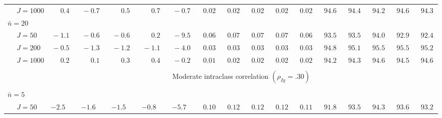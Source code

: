 \begin{sidewaystable}
\begin{threeparttable}
\begin{tabular}{llccccccccccccccc}
 & \nopagebreak $\;J=1000$  & $\phantom{0}\phantom{-}0.4\phantom{0}$ & $\phantom{0}{-}0.7\phantom{0}$ & $\phantom{0}\phantom{-}0.5\phantom{0}$ & $\phantom{0}\phantom{-}0.7\phantom{0}$ & $\phantom{0}{-}0.7\phantom{0}$ & $\phantom{0}0.02\phantom{0}$ & $\phantom{0}0.02\phantom{0}$ & $\phantom{0}0.02\phantom{0}$ & $\phantom{0}0.02\phantom{0}$ & $\phantom{0}0.02\phantom{0}$ & $\phantom{0}94.6\phantom{0}$ & $\phantom{0}94.4\phantom{0}$ & $\phantom{0}94.2\phantom{0}$ & $\phantom{0}94.6\phantom{0}$ & $\phantom{0}94.3\phantom{0}$ \\
\multicolumn{4}{l}{$\bar{n}=20$} \\  & \nopagebreak $\;J=50$  & $\phantom{0}{-}1.1\phantom{0}$ & $\phantom{0}{-}0.6\phantom{0}$ & $\phantom{0}{-}0.6\phantom{0}$ & $\phantom{0}\phantom{-}0.2\phantom{0}$ & $\phantom{0}{-}9.5\phantom{0}$ & $\phantom{0}0.06\phantom{0}$ & $\phantom{0}0.07\phantom{0}$ & $\phantom{0}0.07\phantom{0}$ & $\phantom{0}0.07\phantom{0}$ & $\phantom{0}0.06\phantom{0}$ & $\phantom{0}93.5\phantom{0}$ & $\phantom{0}93.5\phantom{0}$ & $\phantom{0}94.0\phantom{0}$ & $\phantom{0}92.9\phantom{0}$ & $\phantom{0}92.4\phantom{0}$ \\
 & \nopagebreak $\;J=200$  & $\phantom{0}{-}0.5\phantom{0}$ & $\phantom{0}{-}1.3\phantom{0}$ & $\phantom{0}{-}1.2\phantom{0}$ & $\phantom{0}{-}1.1\phantom{0}$ & $\phantom{0}{-}4.0\phantom{0}$ & $\phantom{0}0.03\phantom{0}$ & $\phantom{0}0.03\phantom{0}$ & $\phantom{0}0.03\phantom{0}$ & $\phantom{0}0.03\phantom{0}$ & $\phantom{0}0.03\phantom{0}$ & $\phantom{0}94.8\phantom{0}$ & $\phantom{0}95.1\phantom{0}$ & $\phantom{0}95.5\phantom{0}$ & $\phantom{0}95.5\phantom{0}$ & $\phantom{0}95.2\phantom{0}$ \\
 & \nopagebreak $\;J=1000$  & $\phantom{0}\phantom{-}0.2\phantom{0}$ & $\phantom{0}\phantom{-}0.1\phantom{0}$ & $\phantom{0}\phantom{-}0.3\phantom{0}$ & $\phantom{0}\phantom{-}0.4\phantom{0}$ & $\phantom{0}{-}0.2\phantom{0}$ & $\phantom{0}0.01\phantom{0}$ & $\phantom{0}0.02\phantom{0}$ & $\phantom{0}0.02\phantom{0}$ & $\phantom{0}0.02\phantom{0}$ & $\phantom{0}0.02\phantom{0}$ & $\phantom{0}94.2\phantom{0}$ & $\phantom{0}94.3\phantom{0}$ & $\phantom{0}94.6\phantom{0}$ & $\phantom{0}94.5\phantom{0}$ & $\phantom{0}94.6\phantom{0}$ \\
[0.5ex]\hline\\[-1.6ex] 
& & \multicolumn{15}{c}{Moderate intraclass correlation $(\rho_{Iy}=.30)$} \\[0.6ex]\hline\\[-1.8ex]
\multicolumn{4}{l}{$\bar{n}=5$} \\  & \nopagebreak $\;J=50$  & ${-}2.5\phantom{0}$ & ${-}1.6\phantom{0}$ & ${-}1.5\phantom{0}$ & ${-}0.8\phantom{0}$ & ${-}5.7\phantom{0}$ & $\phantom{0}0.10\phantom{0}$ & $\phantom{0}0.12\phantom{0}$ & $\phantom{0}0.12\phantom{0}$ & $\phantom{0}0.12\phantom{0}$ & $\phantom{0}0.11\phantom{0}$ & $\phantom{0}91.8\phantom{0}$ & $\phantom{0}93.5\phantom{0}$ & $\phantom{0}94.3\phantom{0}$ & $\phantom{0}93.6\phantom{0}$ & $\phantom{0}93.2\phantom{0}$ \\

\end{tabular}
\end{threeparttable}
\end{sidewaystable}
